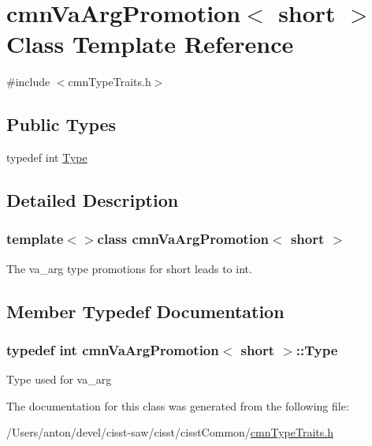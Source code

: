 \hypertarget{classcmn_va_arg_promotion_3_01short_01_4}{}\section{cmn\+Va\+Arg\+Promotion$<$ short $>$ Class Template Reference}
\label{classcmn_va_arg_promotion_3_01short_01_4}


{\ttfamily \#include $<$cmn\+Type\+Traits.\+h$>$}

\subsection*{Public Types}
\begin{DoxyCompactItemize}
\item 
typedef int \hyperlink{classcmn_va_arg_promotion_3_01short_01_4_abea9f2b044faa4608e492ccb14a4282c}{Type}
\end{DoxyCompactItemize}


\subsection{Detailed Description}
\subsubsection*{template$<$$>$class cmn\+Va\+Arg\+Promotion$<$ short $>$}

The va\+\_\+arg type promotions for short leads to int. 

\subsection{Member Typedef Documentation}
\hypertarget{classcmn_va_arg_promotion_3_01short_01_4_abea9f2b044faa4608e492ccb14a4282c}{}
\subsubsection[{Type}]{\setlength{\rightskip}{0pt plus 5cm}typedef int {\bf cmn\+Va\+Arg\+Promotion}$<$ short $>$\+::{\bf Type}}\label{classcmn_va_arg_promotion_3_01short_01_4_abea9f2b044faa4608e492ccb14a4282c}
Type used for va\+\_\+arg 

The documentation for this class was generated from the following file\+:\begin{DoxyCompactItemize}
\item 
/\+Users/anton/devel/cisst-\/saw/cisst/cisst\+Common/\hyperlink{cmn_type_traits_8h}{cmn\+Type\+Traits.\+h}\end{DoxyCompactItemize}

